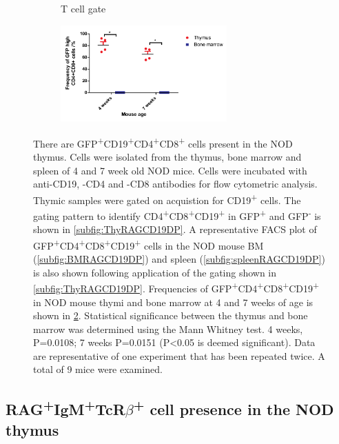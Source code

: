 \begin{figure}
\begin{subfigure}{0.3\textwidth}
	\caption{T cell gate}
	\label{subfig:Tcellgate}
	\end{subfigure}
	\begin{subfigure}{\textwidth}
	\centering
	\includegraphics[width=0.7\textwidth]{Figures/Newallposgraph.pdf}
	\caption{}
	\label{BMvThyDPgraph}
	\end{subfigure}
\caption[There are GFP\textsuperscript{+}CD19\textsuperscript{+}CD4\textsuperscript{+}CD8\textsuperscript{+} cells present in the NOD thymus] {There are GFP\textsuperscript{+}CD19\textsuperscript{+}CD4\textsuperscript{+}CD8\textsuperscript{+} cells present in the NOD thymus.
Cells were isolated from the thymus, bone marrow and spleen of 4 and 7 week old NOD mice.
Cells were incubated with anti-CD19, -CD4 and -CD8 antibodies for flow cytometric analysis.
Thymic samples were gated on acquistion for CD19\textsuperscript{+} cells.
The gating pattern to identify CD4\textsuperscript{+}CD8\textsuperscript{+}CD19\textsuperscript{+} in GFP\textsuperscript{+} and GFP\textsuperscript{-} is shown in \ref{subfig:ThyRAGCD19DP}.
A representative FACS plot of GFP\textsuperscript{+}CD4\textsuperscript{+}CD8\textsuperscript{+}CD19\textsuperscript{+} cells in the NOD mouse BM (\ref{subfig:BMRAGCD19DP}) and spleen (\ref{subfig:spleenRAGCD19DP}) is also shown following application of the gating shown in \ref{subfig:ThyRAGCD19DP}.
Frequencies of GFP\textsuperscript{+}CD4\textsuperscript{+}CD8\textsuperscript{+}CD19\textsuperscript{+} in NOD mouse thymi and bone marrow at 4 and 7 weeks of age is shown in \ref{BMvThyDPgraph}.
Statistical significance between the thymus and bone marrow was determined using the Mann Whitney test. 4 weeks, P=0.0108; 7 weeks P=0.0151 (P<0.05 is deemed significant).
Data are representative of one experiment that has been repeated twice. A total of 9 mice were examined.}
\label{fig:RAGCD19DP}
\end{figure}

\subsection{RAG\textsuperscript{+}IgM\textsuperscript{+}TcR$\beta$\textsuperscript{+} cell presence in the NOD thymus}

